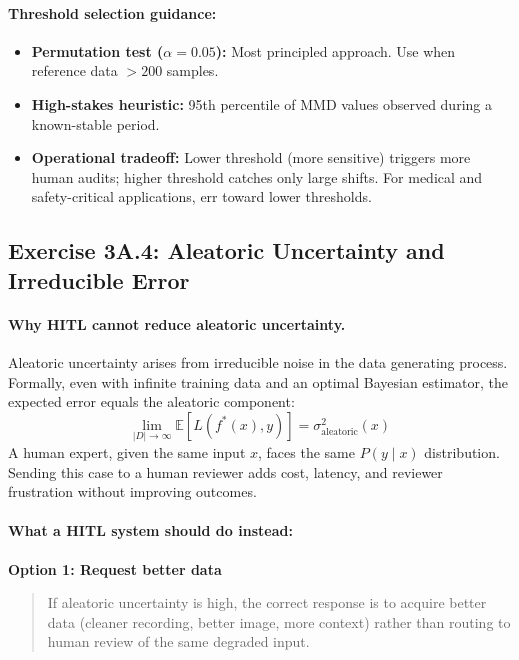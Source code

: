 \paragraph{Threshold selection guidance:}
\begin{itemize}
    \item \textbf{Permutation test ($\alpha = 0.05$):} Most principled approach. Use when reference data $> 200$ samples.
    \item \textbf{High-stakes heuristic:} 95th percentile of MMD values observed during a known-stable period.
    \item \textbf{Operational tradeoff:} Lower threshold (more sensitive) triggers more human audits; higher threshold catches only large shifts. For medical and safety-critical applications, err toward lower thresholds.
\end{itemize}

\subsection{Exercise 3A.4: Aleatoric Uncertainty and Irreducible Error}

\paragraph{Why HITL cannot reduce aleatoric uncertainty.}

Aleatoric uncertainty arises from irreducible noise in the data generating process. Formally, even with infinite training data and an optimal Bayesian estimator, the expected error equals the aleatoric component:
\[
\lim_{|D|\to\infty} \mathbb{E}[L(f^*(x), y)] = \sigma^2_{\text{aleatoric}}(x)
\]
A human expert, given the same input $x$, faces the same $P(y\mid x)$ distribution. Sending this case to a human reviewer adds cost, latency, and reviewer frustration without improving outcomes.

\paragraph{What a HITL system should do instead:}

\textbf{Option 1: Request better data}
\begin{quote}
If aleatoric uncertainty is high, the correct response is to acquire better data (cleaner recording, better image, more context) rather than routing to human review of the same degraded input.
\end{quote}

